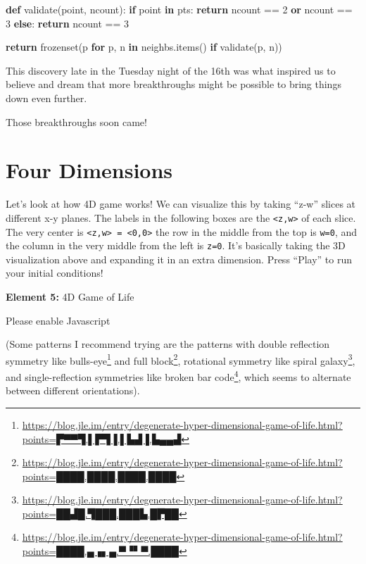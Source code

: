 \documentclass[]{article}
\newenvironment{Shaded}{}{}
\newcommand{\BuiltInTok}[1]{#1}
\newcommand{\ControlFlowTok}[1]{\textcolor[rgb]{0.00,0.44,0.13}{\textbf{#1}}}
\newcommand{\DecValTok}[1]{\textcolor[rgb]{0.25,0.63,0.44}{#1}}
\newcommand{\KeywordTok}[1]{\textcolor[rgb]{0.00,0.44,0.13}{\textbf{#1}}}
\newcommand{\NormalTok}[1]{#1}
\newcommand{\OperatorTok}[1]{\textcolor[rgb]{0.40,0.40,0.40}{#1}}
\renewcommand{\href}[2]{#2\footnote{\url{#1}}}
\begin{document}
\begin{Shaded}
\begin{Highlighting}[]
    \KeywordTok{def}\NormalTok{ validate(point, ncount):}
        \ControlFlowTok{if}\NormalTok{ point }\KeywordTok{in}\NormalTok{ pts:}
            \ControlFlowTok{return}\NormalTok{ ncount }\OperatorTok{==} \DecValTok{2} \KeywordTok{or}\NormalTok{ ncount }\OperatorTok{==} \DecValTok{3}
        \ControlFlowTok{else}\NormalTok{:}
            \ControlFlowTok{return}\NormalTok{ ncount }\OperatorTok{==} \DecValTok{3}

    \ControlFlowTok{return} \BuiltInTok{frozenset}\NormalTok{(p }\ControlFlowTok{for}\NormalTok{ p, n }\KeywordTok{in}\NormalTok{ neighbs.items() }\ControlFlowTok{if}\NormalTok{ validate(p, n))}
\end{Highlighting}
\end{Shaded}

This discovery late in the Tuesday night of the 16th was what inspired us to
believe and dream that more breakthroughs might be possible to bring things down
even further.

Those breakthroughs soon came!

\hypertarget{four-dimensions}{%
\section{Four Dimensions}\label{four-dimensions}}

Let's look at how 4D game works! We can visualize this by taking ``z-w'' slices
at different x-y planes. The labels in the following boxes are the
\texttt{\textless{}z,w\textgreater{}} of each slice. The very center is
\texttt{\textless{}z,w\textgreater{}\ =\ \textless{}0,0\textgreater{}} the row
in the middle from the top is \texttt{w=0}, and the column in the very middle
from the left is \texttt{z=0}. It's basically taking the 3D visualization above
and expanding it in an extra dimension. Press ``Play'' to run your initial
conditions!

\leavevmode\hypertarget{gol4D}{}%
\textbf{Element 5:} 4D Game of Life

\leavevmode\hypertarget{gol4DCont}{}%
Please enable Javascript

(Some patterns I recommend trying are the patterns with double reflection
symmetry like
\href{https://blog.jle.im/entry/degenerate-hyper-dimensional-game-of-life.html?points=▛▀▀▜.▌▛▜▐.▌▙▟▐.▙▄▄▟}{bulls-eye}
and
\href{https://blog.jle.im/entry/degenerate-hyper-dimensional-game-of-life.html?points=████.████.████.████}{full
block}, rotational symmetry like
\href{https://blog.jle.im/entry/degenerate-hyper-dimensional-game-of-life.html?points=██▟█.▜███.███▙.█▛██}{spiral
galaxy}, and single-reflection symmetries like
\href{https://blog.jle.im/entry/degenerate-hyper-dimensional-game-of-life.html?points=████.▄▗▖▄.▀▝▘▀.████}{broken
bar code}, which seems to alternate between different orientations).
\end{document}
